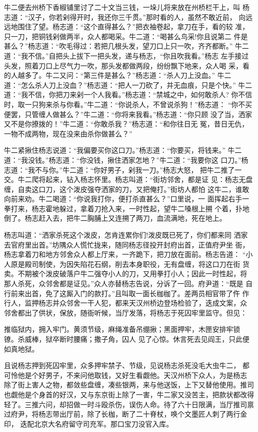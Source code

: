 牛二便去州桥下香椒铺里讨了二十文当三钱，一垛儿将来放在州桥栏干上，叫
杨志道：“汉子，你若剁得开时，我还你三千贯。”那时看的人，虽然不敢近前，
向远远地围住了望。杨志道：“这个直得甚么？”把衣袖卷起，拿刀在手，看的较
准，只一刀，把铜钱剁做两半，众人都喝采。牛二道：“喝甚么鸟采!你且说第二
件是甚么？”杨志道：“吹毛得过：若把几根头发，望刀口上只一吹，齐齐都断。”
牛二道：“我不信。”自把头上拔下一把头发，递与杨志，“你且吹我看。”杨志
左手接过头发，照着刀口上尽气力一吹，那头发都做两段，纷纷飘下地来，众人喝
采，看的人越多了。牛二又问：“第三件是甚么？”杨志道：“杀人刀上没血。”
牛二道：“怎么杀人刀上没血？”杨志道：“把人一刀砍了，并无血痕，只是个快。”
牛二道：“我不信，你把刀来剁一个人我看。”杨志道：“禁城之中，如何敢杀人?
你不信时，取一只狗来杀与你看。”牛二道：“你说杀人，不曾说杀狗！”杨志道：
“你不买便罢，只管缠人做甚么？”牛二道：“你将来我看。”杨志道：“你只顾
没了当，洒家又不是你撩拨的！”牛二道：“你敢杀我？”杨志道：“和你往日无
冤，昔日无仇，一物不成两物，现在没来由杀你做甚么？”

牛二紧揪住杨志说道：“我偏要买你这口刀。”杨志道：“你要买，将钱来。”
牛二道：“我没钱。”杨志道：“你没钱，揪住洒家怎地？”牛二道：“我要你这
口刀。”杨志道：“我不与你。”牛二道：“你好男子，剁我一刀。”杨志大怒，
把牛二推了一交。牛二爬将起来，钻入杨志怀里。杨志叫道：“街坊邻舍，都是证
见：杨志无盘缠，自卖这口刀，这个泼皮强夺洒家的刀，又把俺打。”街坊人都怕
这牛二，谁敢向前来劝。牛二喝道：“你说我打你，便打杀直甚么？”口里说，一
面挥起右手一拳打来，杨志霍地躲过，拿着刀抢入来，一时性起，望牛二嗓根上搠
个着，扑地倒了。杨志赶入去，把牛二胸脯上又连搠了两刀，血流满地，死在地上。

杨志叫道：“洒家杀死这个泼皮，怎肯连累你们!泼皮既已死了，你们都来同
洒家去官府里出首。”坊隅众人慌忙拢来，随同杨志径投开封府出首，正值府尹坐
衙，杨志拿着刀和地方邻舍众人都上厅来，一齐跪下，把刀放在面前。杨志告道：
“小人原是殿司制使，为因失陷花石纲，削去本身职役，无有盘缠，将这口刀在街
货卖。不期被个泼皮破落户牛二强夺小人的刀，又用拳打小人；因此一时性起，将
那人杀死，众邻舍都是证见。”众人亦替杨志告说，分诉了一回。府尹道：“既是
自行前来出首，免了这厮入门的款打。”且叫取一面长枷枷了。差两员相官带了仵
作行人，监押杨志并众邻舍一干人犯，都来天汉州桥边登场检验了，迭成文案，众
邻舍都出了供状，保放，随衙听候，当厅发落，将杨志于死囚牢里监守。但见：

推临狱内，拥入牢门。黄须节级，麻绳准备吊绷揪；黑面押牢，木匣安排牢锁
镣。杀威棒，狱卒断时腰痛；撒子角，囚人
见了心惊。休言死去见阎王，只此便如真地狱。

且说杨志押到死囚牢里，众多押牢禁子、节级，见说杨志杀死没毛大虫牛二，
都可怜他是个好男子，不来问他取钱，又好生看觑他。天汉州桥下众人，为是杨志
除了街上害人之物，都敛些盘缠，凑些银两，来与他送饭，上下又替他使用。推司
也觑他是个身首的好汉，又与东京街上除了一害，牛二家又没苦主，把款状都改得
轻了。三推六问，却招做一时斗殴杀伤，误伤人命。待了六十日限满，当厅推司禀
过府尹，将杨志带出厅前，除了长枷，断了二十脊杖，唤个文墨匠人刺了两行金印，
迭配北京大名府留守司充军。那口宝刀没官入库。

